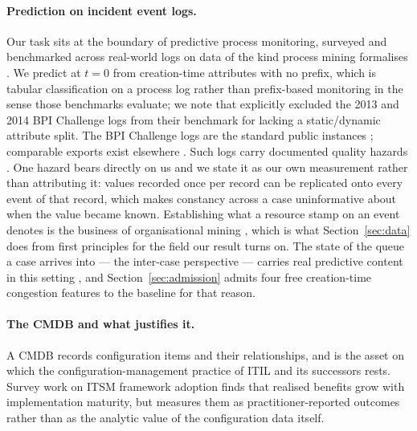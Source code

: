 \documentclass[preprint,12pt]{elsarticle}
\begin{document}
\paragraph{Prediction on incident event logs.}
Our task sits at the boundary of predictive process monitoring, surveyed and
benchmarked across real-world logs \citep{teinemaa2019outcome,verenich2019survey}
on data of the kind process mining formalises \citep{vanderaalst2016process}.
We predict at $t=0$ from creation-time attributes with no prefix, which is
tabular classification on a process log rather than prefix-based monitoring
in the sense those benchmarks evaluate; we note that
\citet{teinemaa2019outcome} explicitly excluded the 2013 and 2014 BPI
Challenge logs from their benchmark for lacking a static/dynamic attribute
split. The BPI Challenge logs are the standard public instances
\citep{vandongen2014bpic,steeman2013bpic}; comparable exports exist elsewhere
\citep{amaral2018incident}. Such logs carry documented quality hazards
\citep{suriadi2017imperfection}. One hazard bears directly on us and we
state it as our own measurement rather than attributing it: values recorded
once per record can be replicated onto every event of that record, which
makes constancy across a case uninformative about when the value became
known. Establishing what a resource stamp on an event denotes is the business
of organisational mining \citep{vanderaalst2005social}, which is what
Section~\ref{sec:data} does from first principles for the field our result
turns on. The state of the queue a case arrives into --- the inter-case
perspective --- carries real predictive content in this setting
\citep{senderovich2017intercase}, and Section~\ref{sec:admission} admits four
free creation-time congestion features to the baseline for that reason.

\paragraph{The CMDB and what justifies it.}
A CMDB records configuration items and their relationships, and is the asset
on which the configuration-management practice of ITIL and its successors
rests. Survey work on ITSM framework adoption \citep{marrone2011itil} finds
that realised benefits grow with implementation maturity, but measures them
as practitioner-reported outcomes rather than as the analytic value of the
configuration data itself.
\end{document}
